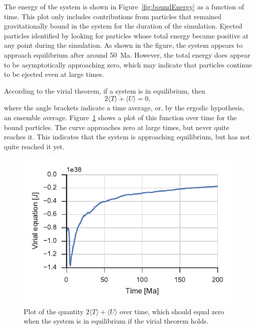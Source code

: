 \documentclass[aps,prc,reprint,floatfix,nobalancelastpage]{revtex4-1}
\begin{document}
    The energy of the system is shown in Figure~\ref{fig:boundEnergy} as a function of time. This plot only includes contributions from particles that remained gravitationally bound in the system for the duration of the simulation. Ejected particles identified by looking for particles whose total energy became positive at any point during the simulation. As shown in the figure, the system appears to approach equilibrium after around \SI{50}{Ma}. However, the total energy does appear to be asymptotically approaching zero, which may indicate that particles continue to be ejected even at large times.

    According to the virial theorem, if a system is in equilibrium, then
    \begin{equation}
        2\langle T \rangle + \langle U \rangle = 0, \label{eq:virial}
    \end{equation}
    where the angle brackets indicate a time average, or, by the ergodic hypothesis, an ensemble average. \cite{Hjorth-Jensen2016} Figure~\ref{fig:virial} shows a plot of this function over time for the bound particles. The curve approaches zero at large times, but never quite reaches it. This indicates that the system is approaching equilibrium, but has not quite reached it yet.

    \begin{figure}[p]
        \centering
        \includegraphics{virial.pdf}
        \caption{Plot of the quantity $2\langle T \rangle + \langle U \rangle$ over time, which should equal zero when the system is in equilibrium if the virial theorem holds.}
        \label{fig:virial}
    \end{figure}
\end{document}
